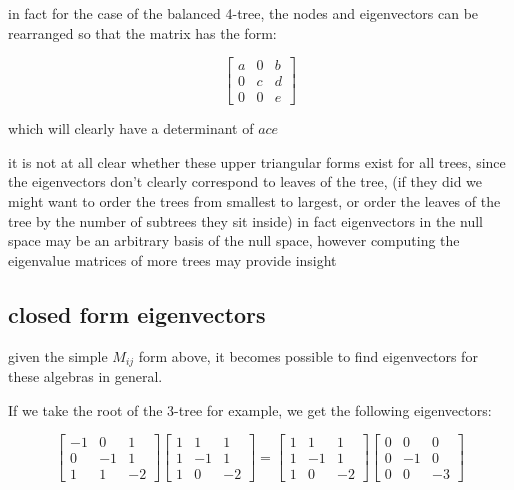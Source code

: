 \documentclass{report}
\begin{document}
in fact for the case of the balanced 4-tree, the nodes and eigenvectors can be
rearranged so that the matrix has the form:

\begin{equation*}
\left[ \begin{matrix}
a & 0 & b\\
0 & c & d\\
0 & 0 & e
\end{matrix} \right]
\end{equation*}

which will clearly have a determinant of $ace$

it is not at all clear whether these upper triangular forms exist for all
trees, since the eigenvectors don't clearly correspond to leaves of the tree,
(if they did we might want to order the trees from smallest to largest, or
order the leaves of the tree by the number of subtrees they sit inside)
in fact eigenvectors in the null space may be an arbitrary basis of the null
space, however computing the eigenvalue matrices of more trees may provide
insight



\subsection{closed form eigenvectors}

given the simple $M_{ij}$ form above, it becomes possible to find eigenvectors for
these algebras in general.

If we take the root of the 3-tree for example, we get the following
eigenvectors:

\begin{equation*}
\left[\begin{matrix}
	-1 & 0 & 1\\
	0 & -1 & 1\\
	1 & 1 & -2
\end{matrix}\right]
\left[\begin{matrix}
	1 & 1 & 1\\
	1 & -1 & 1\\
	1 & 0 & -2
\end{matrix}\right]
=
\left[\begin{matrix}
	1 & 1 & 1\\
	1 & -1 & 1\\
	1 & 0 & -2
\end{matrix}\right]
\left[\begin{matrix}
	0 & 0 & 0\\
	0 & -1 & 0\\
	0 & 0 & -3
\end{matrix}\right]
\end{equation*}
\end{document}
